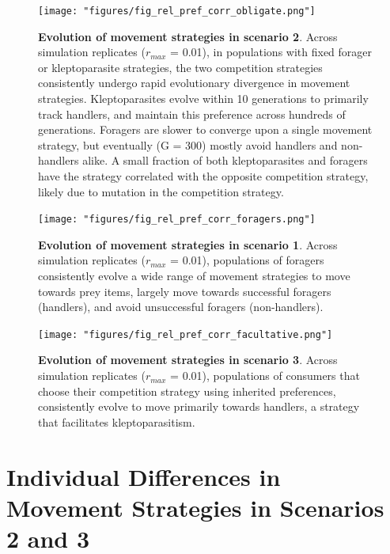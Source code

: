 \documentclass[]{article}
\begin{document}
\begin{figure}
\centering
\texttt{[image: "figures/fig\_rel\_pref\_corr\_obligate.png"]}
\caption{\textbf{Evolution of movement strategies in scenario 2}. Across simulation replicates (\(r_{max}\) = 0.01), in populations with fixed forager or kleptoparasite strategies, the two competition strategies consistently undergo rapid evolutionary divergence in movement strategies. Kleptoparasites evolve within 10 generations to primarily track handlers, and maintain this preference across hundreds of generations. Foragers are slower to converge upon a single movement strategy, but eventually (G = 300) mostly avoid handlers and non-handlers alike. A small fraction of both kleptoparasites and foragers have the strategy correlated with the opposite competition strategy, likely due to mutation in the competition strategy.}
\end{figure}

\begin{figure}
\centering
\texttt{[image: "figures/fig\_rel\_pref\_corr\_foragers.png"]}
\caption{\textbf{Evolution of movement strategies in scenario 1}. Across simulation replicates (\(r_{max}\) = 0.01), populations of foragers consistently evolve a wide range of movement strategies to move towards prey items, largely move towards successful foragers (handlers), and avoid unsuccessful foragers (non-handlers).}
\end{figure}

\begin{figure}
\centering
\texttt{[image: "figures/fig\_rel\_pref\_corr\_facultative.png"]}
\caption{\textbf{Evolution of movement strategies in scenario 3}. Across simulation replicates (\(r_{max}\) = 0.01), populations of consumers that choose their competition strategy using inherited preferences, consistently evolve to move primarily towards handlers, a strategy that facilitates kleptoparasitism.}
\end{figure}

\newpage

\hypertarget{individual-differences-in-movement-strategies-in-scenarios-2-and-3}{%
\section{Individual Differences in Movement Strategies in Scenarios 2 and 3}\label{individual-differences-in-movement-strategies-in-scenarios-2-and-3}}
\end{document}
